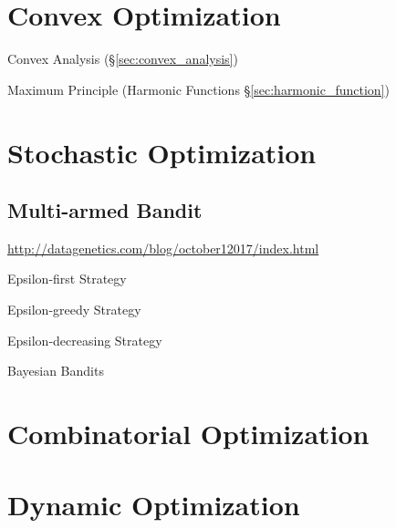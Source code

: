 \section{Convex Optimization}\label{sec:convex_optimization}

Convex Analysis (\S\ref{sec:convex_analysis})

Maximum Principle (Harmonic Functions \S\ref{sec:harmonic_function})



\section{Stochastic Optimization}\label{sec:stochastic_optimization}

\subsection{Multi-armed Bandit}\label{sec:multiarmed_bandit}

\url{http://datagenetics.com/blog/october12017/index.html}

Epsilon-first Strategy

Epsilon-greedy Strategy

Epsilon-decreasing Strategy

Bayesian Bandits



\section{Combinatorial Optimization}
\label{sec:combinatorial_optimization}

\section{Dynamic Optimization}\label{sec:dynamic_optimization}

